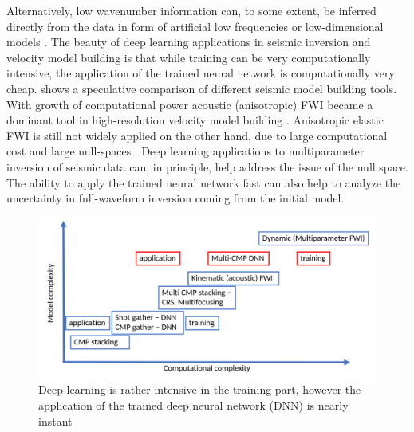 \documentclass[manuscript]{geophysics}
\begin{document}
Alternatively, low wavenumber information can, to some extent, be inferred directly from the data in form of artificial low frequencies \citep{ovcharenkoNeuralNetworkBased2017, ovcharenkoLowFrequencyDataExtrapolation2018, ovcharenko2019deep, jin2018learn, sunLowFrequencyExtrapolation2018, kazei2019realistically} or low-dimensional models \citep[e.g.][]{polo2018, wu2018inversionnet}. The beauty of deep learning applications in seismic inversion and velocity model building is that while training can be very computationally intensive, the application of the trained neural network is computationally very cheap.  shows a speculative comparison of different seismic model building tools. With growth of computational power acoustic (anisotropic) FWI became a dominant tool in high-resolution velocity model building \citep[e.g.][]{warner2013}. Anisotropic elastic FWI is still not widely applied on the other hand, due to large computational cost and large null-spaces \citep{kohn2015,kazei2018,kazei2019scattering, podgornovaResolutionVTIAnisotropy2018}. Deep learning applications to multiparameter inversion of seismic data \citep{ivanov2017traveltime, dramsch2019deep, zhang2019regularized} can, in principle, help address the issue of the null space.
The ability to apply the trained neural network fast can also help to analyze the uncertainty in full-waveform inversion coming from the initial model.

\begin{figure}
	\centering
	\includegraphics[width=0.9\linewidth]{Fig/learningParadigm}
	\caption{Deep learning is rather intensive in the training part, however the application of the trained deep neural network (DNN) is nearly instant}
	\label{fig:learningParadigm}
\end{figure}
\end{document}
